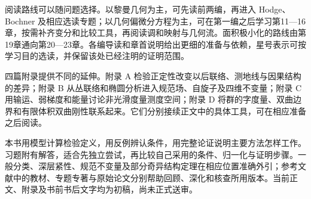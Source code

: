 \ProseParagraphBreak
阅读路线可以随问题选择。以黎曼几何为主，可先读前两编，再进入 Hodge、Bochner 及相应选读专题；以几何偏微分方程为主，可在第一编之后学习第11—16章，按需补齐变分和比较工具，再阅读调和映射与几何流。面积极小化的路线由第19章通向第20—23章。各编导读和章首说明给出更细的准备与依赖，星号表示可按学习目的选读，并保留该处已经注明的证明范围。

\ProseParagraphBreak
四篇附录提供不同的延伸。附录 A 检验正定性改变以后联络、测地线与因果结构的差异；附录 B 从丛联络和椭圆分析进入规范场、自旋子及四维不变量；附录 C 用输运、弱梯度和能量讨论非光滑度量测度空间；附录 D 将群的字度量、双曲边界和有限体积双曲刚性联系起来。它们分别接续正文中的具体工具，可在相应准备之后阅读。

\ProseParagraphBreak
本书用模型计算检验定义，用反例辨认条件，用完整论证说明主要方法怎样工作。习题附有解答，适合先独立尝试，再比较自己采用的条件、归一化与证明步骤。一般分类、深层紧性、规范不变量及部分奇异结构定理在相应位置准确外引；参考文献中的教材、专题专著与原始论文分别帮助回顾、深化和核查所用版本。当前正文、附录及书前书后文字均为初稿，尚未正式送审。
